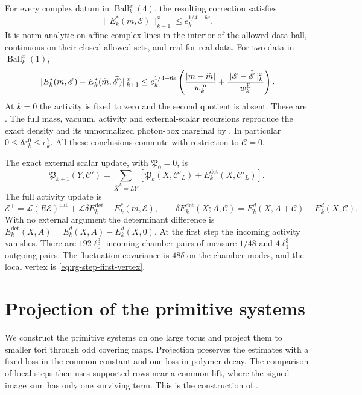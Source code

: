 For every complex datum in \(\operatorname{Ball}_k^x(4)\), the resulting
correction satisfies
\[
 \|E_k^*(m,\mathscr E)\|_{k+1}^x\le e_k^{1/4-6\varepsilon}.
\]
It is norm analytic on affine complex lines in the interior of the
allowed data ball, continuous on their closed allowed sets, and real
for real data. For two data in \(\operatorname{Ball}_k^x(1)\),
\[
 \|E_k^*(m,\mathscr E)-E_k^*(\widetilde m,\widetilde{\mathscr E})\|_{k+1}^x
 \le e_k^{1/4-6\varepsilon}
 \left(\frac{|m-\widetilde m|}{w_k^{\rm m}}
       +\frac{\|\mathscr E-\widetilde{\mathscr E}\|_k^x}{w_k^{\rm E}}\right).
\]
At \(k=0\) the activity is fixed to zero and the second quotient is
absent. These are \cite[Proposition 8.1]{NonlinearStep}.
The full mass, vacuum, activity and external-scalar recursions reproduce
the exact density and its unnormalized photon-box marginal by
\cite[Theorem A]{NonlinearStep}.
In particular \(0\le\delta\varepsilon_k^0\le e_k^7\).
All these conclusions commute with restriction to \(\mathscr C=0\).


The exact external scalar update, with $\mathfrak P_0=0$, is
\begin{equation}\label{eq:rgnl-external-scalar-map}
 \mathfrak P_{k+1}(Y,\mathscr C')
  =\sum_{\bar X^L=LY}
       [\mathfrak P_k(X,\mathscr C'_L)+E_k^{\mathrm{det}}(X,\mathscr C'_L)].
\end{equation}
The full activity update is
\[
 \mathscr E^+=\mathcal L(R\mathscr E)^{\mathrm{nat}}
                +\mathcal L\delta E_k^{\mathrm{det}}+E_k^*(m,\mathscr E),
 \qquad
 \delta E_k^{\mathrm{det}}(X;A,\mathscr C)
       =E_k^d(X,A+\mathscr C)-E_k^d(X,\mathscr C).
\]
With no external argument the determinant difference is
$E_k^{\mathrm{det}}(X,A)=E_k^d(X,A)-E_k^d(X,0)$.
At the first step the incoming activity vanishes. There are
$192\ell_0^3$ incoming chamber pairs of measure $1/48$ and
$4\ell_1^3$ outgoing pairs. The fluctuation covariance is $48\delta$
on the chamber modes, and the local vertex is
\eqref{eq:rg-step-first-vertex}.
\section{Projection of the primitive systems}\label{sec:rg-cover-comparison}

We construct the primitive systems on one large torus and
project them to smaller tori through odd covering maps. Projection preserves the
estimates with a fixed loss in the common constant and
one loss in polymer decay. The comparison of local steps
then uses supported rows near a common lift, where the
signed image sum has only one surviving term.
This is the construction of \cite[\S\S15.1--15.3]{QED3Master}.

